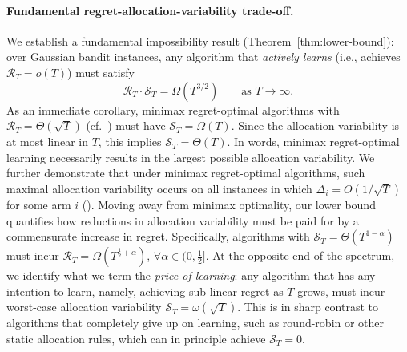 \documentclass[nonblindrev]{informs3_noinforms}
\begin{document}
\paragraph{Fundamental regret-allocation-variability trade-off.} 
We establish a fundamental impossibility result (Theorem~\ref{thm:lower-bound}): over Gaussian bandit instances, any algorithm that \emph{actively learns} (i.e., achieves $\mathcal{R}_T=o(T)$) must satisfy
\[
\mathcal{R}_T\cdot\mathcal{S}_T=\Omega\!\left(T^{3/2}\right)
\qquad\text{as }T\to\infty.
\]
As an immediate corollary, minimax regret-optimal algorithms with $\mathcal{R}_T=\Theta(\sqrt{T})$ (cf.~\cite{lattimore2020bandit}) must have $\mathcal{S}_T=\Omega(T)$. Since the allocation variability is at most linear in $T$, this implies $\mathcal{S}_T=\Theta(T)$. In words, minimax regret-optimal learning necessarily results in the largest possible allocation variability. We further demonstrate that under minimax regret-optimal algorithms, such maximal allocation variability occurs on all instances in which $\Delta_i = O(1/\sqrt{T})$ for some arm $i$ (). Moving away from minimax optimality, our lower bound quantifies how reductions in allocation variability must be paid for by a commensurate increase in regret. Specifically, algorithms with $\mathcal S_T=\Theta(T^{1-\alpha})$ must incur $\mathcal R_T=\Omega(T^{\frac{1}{2}+\alpha})$, $\forall\alpha\in(0,\frac{1}{2}]$. At the opposite end of the spectrum, we identify what we term the \textit{price of learning}: any algorithm that has any intention to learn, namely, achieving sub-linear regret as $T$ grows, must incur worst-case allocation variability $ \mathcal{S}_T = \omega(\sqrt{T})$. This is in sharp contrast to algorithms that completely give up on learning, such as round-robin or other static allocation rules, which can in principle achieve $\mathcal{S}_T = 0.$ 
\end{document}
